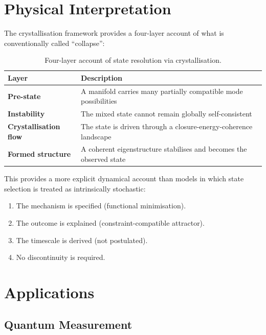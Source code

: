 \documentclass[12pt]{article}
\begin{document}
\section{Physical Interpretation}

The crystallisation framework provides a four-layer account of what is conventionally called ``collapse'':

\begin{table}[ht]
\centering
\caption{Four-layer account of state resolution via crystallisation.}
\label{tab:layers}
\begin{tabular}{@{}ll@{}}
\toprule
Layer & Description \\
\midrule
\textbf{Pre-state} & A manifold carries many partially compatible mode possibilities \\
\textbf{Instability} & The mixed state cannot remain globally self-consistent \\
\textbf{Crystallisation flow} & The state is driven through a closure-energy-coherence landscape \\
\textbf{Formed structure} & A coherent eigenstructure stabilises and becomes the observed state \\
\bottomrule
\end{tabular}
\end{table}

This provides a more explicit dynamical account than models in which state selection is treated as intrinsically stochastic:
\begin{enumerate}
    \item The mechanism is specified (functional minimisation).
    \item The outcome is explained (constraint-compatible attractor).
    \item The timescale is derived (not postulated).
    \item No discontinuity is required.
\end{enumerate}

\section{Applications}

\subsection{Quantum Measurement}
\end{document}
